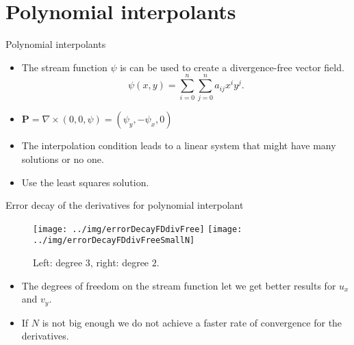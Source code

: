 \documentclass{beamer}
\begin{document}
\section{Polynomial interpolants}
\begin{frame}{Polynomial interpolants}
  \begin{itemize}
    \item The stream function $\psi$ is can be used to create a divergence-free
      vector field.
      \begin{equation*}
	\psi(x,y) = \sum_{i=0}^n\sum_{j=0}^n a_{ij}x^i y^j.
      \end{equation*}
    
    \item $\mathbf{P} = \nabla \times (0,0,\psi) = (\psi_y,-\psi_x,0)$

    \item The interpolation condition leads to a linear system that might have
      many solutions or no one.

    \item Use the least squares solution.
  \end{itemize}
\end{frame}

\begin{frame}{Error decay of the derivatives for polynomial interpolant}
  \begin{figure}[htb]
    \begin{center}
      \texttt{[image: ../img/errorDecayFDdivFree]}
      \texttt{[image: ../img/errorDecayFDdivFreeSmallN]}
    \end{center}
    \caption{Left: degree $3$, right: degree $2$.}
  \end{figure}
  
  \begin{itemize}
    \item The degrees of freedom on the stream function let we get better
      results for $u_x$ and $v_y$.
      
    \item If $N$ is not big enough we do not achieve a faster rate of
      convergence for the derivatives.
  \end{itemize}
\end{frame}
\end{document}
